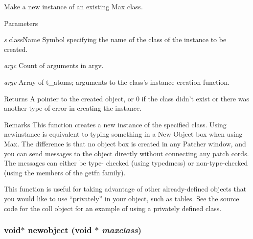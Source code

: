 Make a new instance of an existing Max class. 
\begin{DoxyParams}{Parameters}
\item[{\em s}]className Symbol specifying the name of the class of the instance to be created. \item[{\em argc}]Count of arguments in argv. \item[{\em argv}]Array of t\_\-atoms; arguments to the class’s instance creation function.\end{DoxyParams}
\begin{DoxyReturn}{Returns}
A pointer to the created object, or 0 if the class didn’t exist or there was another type of error in creating the instance.
\end{DoxyReturn}
\begin{DoxyRemark}{Remarks}
This function creates a new instance of the specified class. Using newinstance is equivalent to typing something in a New Object box when using Max. The difference is that no object box is created in any Patcher window, and you can send messages to the object directly without connecting any patch cords. The messages can either be type-\/ checked (using typedmess) or non-\/type-\/checked (using the members of the getfn family).
\end{DoxyRemark}
This function is useful for taking advantage of other already-\/defined objects that you would like to use “privately” in your object, such as tables. See the source code for the coll object for an example of using a privately defined class. \hypertarget{group__class__old_ga053f428d5edcc7d663980330848e73a6}{
\subsubsection[{newobject}]{\setlength{\rightskip}{0pt plus 5cm}void$\ast$ newobject (void $\ast$ {\em maxclass})}}
\label{group__class__old_ga053f428d5edcc7d663980330848e73a6}


